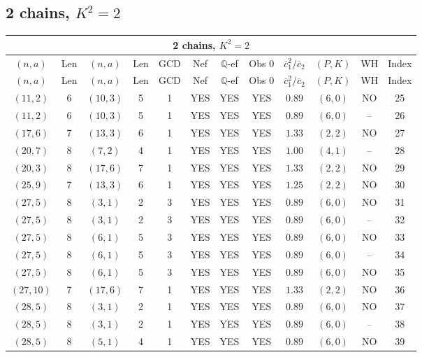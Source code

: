 \subsection{2 chains, $K^2 = 2$}
\begin{longtable}{|c|c|c|c|c|c|c|c|c|c|c|c|}
\hline
\multicolumn{12}{|c|}{2 chains, $K^2 = 2$}\\
\hline
$(n,a)$ & Len & $(n,a)$ & Len & GCD & Nef & $\mathbb Q$-ef & Obs 0 & $\overline c_1^2 / \overline c_2$ & $(P,K)$ & WH & Index\\
\hline
\endfirsthead

\hline
$(n,a)$ & Len & $(n,a)$ & Len & GCD & Nef & $\mathbb Q$-ef & Obs 0 & $\overline c_1^2 / \overline c_2$ & $(P,K)$ & WH & Index\\
\hline
\endhead
\hline
\endfoot

$(11,2)$ & 6 & $(10,3)$ & 5 & 1 & YES & YES & YES & $0.89$ & $(6,0)$ & NO & 25\\
$(11,2)$ & 6 & $(10,3)$ & 5 & 1 & YES & YES & YES & $0.89$ & $(6,0)$ & -- & 26\\
$(17,6)$ & 7 & $(13,3)$ & 6 & 1 & YES & YES & YES & $1.33$ & $(2,2)$ & NO & 27\\
$(20,7)$ & 8 & $(7,2)$ & 4 & 1 & YES & YES & YES & $1.00$ & $(4,1)$ & -- & 28\\
$(20,3)$ & 8 & $(17,6)$ & 7 & 1 & YES & YES & YES & $1.33$ & $(2,2)$ & NO & 29\\
$(25,9)$ & 7 & $(13,3)$ & 6 & 1 & YES & YES & YES & $1.25$ & $(2,2)$ & NO & 30\\
$(27,5)$ & 8 & $(3,1)$ & 2 & 3 & YES & YES & YES & $0.89$ & $(6,0)$ & NO & 31\\
$(27,5)$ & 8 & $(3,1)$ & 2 & 3 & YES & YES & YES & $0.89$ & $(6,0)$ & -- & 32\\
$(27,5)$ & 8 & $(6,1)$ & 5 & 3 & YES & YES & YES & $0.89$ & $(6,0)$ & NO & 33\\
$(27,5)$ & 8 & $(6,1)$ & 5 & 3 & YES & YES & YES & $0.89$ & $(6,0)$ & -- & 34\\
$(27,5)$ & 8 & $(6,1)$ & 5 & 3 & YES & YES & YES & $0.89$ & $(6,0)$ & NO & 35\\
$(27,10)$ & 7 & $(17,6)$ & 7 & 1 & YES & YES & YES & $1.33$ & $(2,2)$ & NO & 36\\
$(28,5)$ & 8 & $(3,1)$ & 2 & 1 & YES & YES & YES & $0.89$ & $(6,0)$ & NO & 37\\
$(28,5)$ & 8 & $(3,1)$ & 2 & 1 & YES & YES & YES & $0.89$ & $(6,0)$ & -- & 38\\
$(28,5)$ & 8 & $(5,1)$ & 4 & 1 & YES & YES & YES & $0.89$ & $(6,0)$ & NO & 39\\

\end{longtable}
